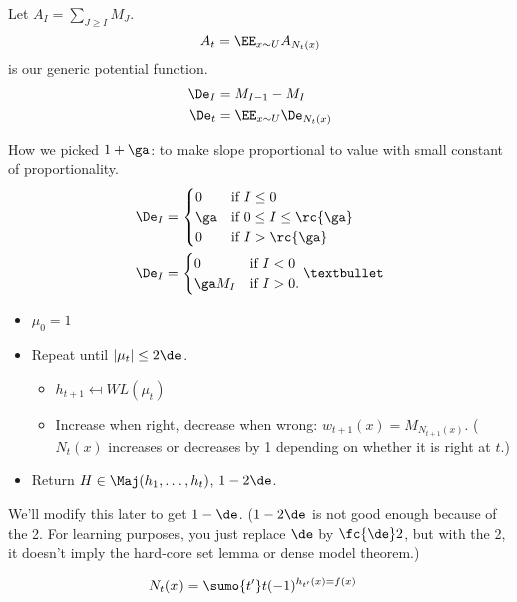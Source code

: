 Let $A_I=\sum_{J\ge I} M_J$. 
$$A_t=\EE_{x\sim U} A_{N_t(x)}$$
is our generic potential function.
\begin{align}
\De_I &=M_{I-1}-M_I\\
\De_t &= \EE_{x\sim U} \De_{N_t(x)}
\end{align}

How we picked $1+\ga$: to make slope proportional to value with small constant of proportionality.
\begin{align}
\De_I &=\begin{cases}
0&\text{if }I\le 0\\
\ga&\text{if }0\le I \le \rc{\ga}\\
0&\text{if }I>\rc{\ga}
\end{cases}\\
\De_I &= \begin{cases}
0&\text{if }I<0\\
\ga M_I&\text{if }I>0.
\end{cases}•
\end{align}

\begin{alg}
\begin{itemize}
\item
$\mu_0=1$
\item
Repeat until $|\mu_t|\le 2\de$.
\begin{itemize}
\item
$h_{t+1}\mapsfrom WL(\mu_t)$
\item
Increase when right, decrease when wrong:
$w_{t+1}(x) = M_{N_{t+1}(x)}$.
($N_t(x)$ increases or decreases by 1 depending on whether it is right at $t$.)
\end{itemize}
\item
Return $H\in \Maj(h_1,\ldots, h_t)$, $1-2\de$. 
\end{itemize}
\end{alg}
We'll modify this later to get $1-\de$.
($1-2\de$ is not good enough because of the 2. For learning purposes, you just replace $\de$ by $\fc{\de}2$, but with the 2, it doesn't imply the hard-core set lemma or dense model theorem.) 

\begin{align}
N_t(x) &= \sumo{t'}t (-1)^{h_{t'}(x)=f(x)}
\end{align}

